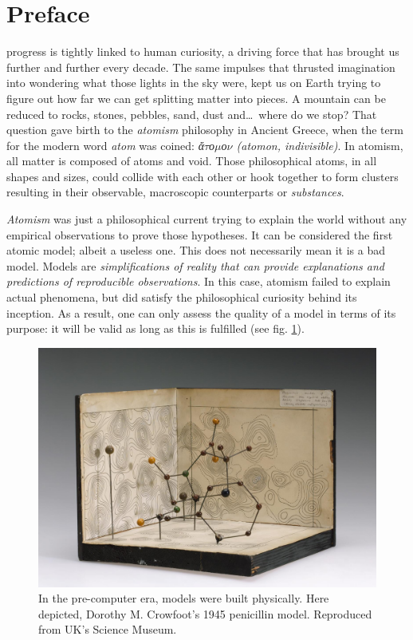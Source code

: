 
\chapter*{Preface}
\label{chap:preface}

 progress is tightly linked to human curiosity, a driving force that has brought us further and further every decade. The same impulses that thrusted imagination into wondering what those lights in the sky were, kept us on Earth trying to figure out how far we can get splitting matter into pieces. A mountain can be reduced to rocks, stones, pebbles, sand, dust and\ldots\  where do we stop? That question gave birth to the \textit{atomism} philosophy in Ancient Greece, when the term for the modern word \textit{atom} was coined: \textit{ἄ$\tau$ο$\mu$ο$\nu$ (atomon, indivisible)}. In atomism, all matter is composed of atoms and void. Those philosophical atoms, in all shapes and sizes, could collide with each other or hook together to form clusters resulting in their observable, macroscopic counterparts or \textit{substances}.

\textit{Atomism} was just a philosophical current trying to explain the world without any empirical observations to prove those hypotheses. It can be considered the first atomic model; albeit a useless one. This does not necessarily mean it is a bad model. Models are \textit{simplifications of reality that can provide explanations and predictions of reproducible observations}. In this case, atomism failed to explain actual phenomena, but did satisfy the philosophical curiosity behind its inception. As a result, one can only assess the quality of a model in terms of its purpose: it will be valid as long as this is fulfilled (see fig. \ref{fig:penicillin}).



\begin{figure}[hbtp]
	\includegraphics[width=\textwidth]{./figures/01/penicillin.jpg}
	\cprotect\caption[Dorothy M. Crowfoot's 1945 Penicillin model]{In the pre-computer era, models were built physically. Here depicted, Dorothy M. Crowfoot's 1945 penicillin model. Reproduced from UK's Science Museum.\cite{uksciencemuseum}}
	\label{fig:penicillin}
\end{figure}


